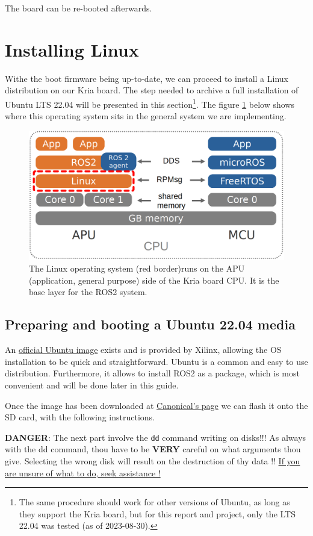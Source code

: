 \documentclass[10pt]{article}
\begin{document}
The board can be re-booted afterwards.
\pagebreak

\section{Installing Linux}
\label{sec:org68c1a0f}
Withe the boot firmware being up-to-date, we can proceed to install a Linux distribution
on our Kria board. The step needed to archive a full installation of Ubuntu LTS 22.04
will be presented in this section\footnote{The same procedure should work for other versions of Ubuntu, as long as they
support the Kria board, but for this report and project, only the LTS 22.04 was tested
(as of 2023-08-30).}. The figure \ref{fig:org7d36017} below shows
where this operating system sits in the general system we are implementing.

\begin{figure}[htbp]
\centering
\includegraphics[width=.6\textwidth]{./img/map_linux.png}
\caption{\label{fig:org7d36017}The Linux operating system (red border)runs on the APU (application, general purpose) side of the Kria board CPU. It is the base layer for the ROS2 system.}
\end{figure}

\subsection{Preparing and booting a Ubuntu 22.04 media}
\label{sec:orgdbb451e}
An \href{https://ubuntu.com/download/amd-xilinx}{official Ubuntu image} exists and is
provided by Xilinx, allowing the OS installation to be quick and
straightforward.
Ubuntu is a common and easy to use distribution. Furthermore,
it allows to install ROS2 as a package, which is most convenient and will be
done later in this guide.

Once the image has been downloaded at \href{https://ubuntu.com/download/amd-xilinx}{Canonical's page}
we can flash it onto the SD card, with the following instructions.

\begin{tcolorbox}[colback=red!5!white,colframe=red!75!black]
\textbf{DANGER}: The next part involve the \texttt{dd} command writing on disks!!!
As always with the dd command, thou have to be \textbf{VERY} careful on what arguments
thou give. Selecting the wrong disk will result on the destruction of
thy data !!
\uline{If you are unsure of what to do, seek assistance !}
\end{tcolorbox}
\end{document}
